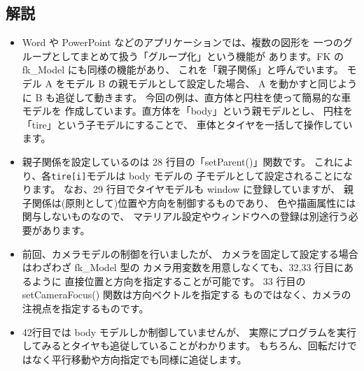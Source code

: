 \subsection*{解説}
\begin{itemize}
 \item Word や PowerPoint などのアプリケーションでは、複数の図形を
	一つのグループとしてまとめて扱う「グループ化」という機能が
	あります。FK の fk\_Model にも同様の機能があり、
	これを「親子関係」と呼んでいます。
	モデル A をモデル B の親モデルとして設定した場合、
	A を動かすと同じように B も追従して動きます。
	今回の例は、直方体と円柱を使って簡易的な車モデルを
	作成しています。直方体を「body」という親モデルとし、
	円柱を「tire」という子モデルにすることで、
	車体とタイヤを一括して操作しています。

 \item 親子関係を設定しているのは 28 行目の「setParent()」関数です。
	これにより、各\verb+tire[i]+モデルは body モデルの
	子モデルとして設定されることになります。
	なお、29 行目でタイヤモデルも window に登録していますが、
	親子関係は(原則として)位置や方向を制御するものであり、
	色や描画属性には関与しないものなので、
	マテリアル設定やウィンドウへの登録は別途行う必要があります。

 \item 前回、カメラモデルの制御を行いましたが、
	カメラを固定して設定する場合はわざわざ fk\_Model 型の
	カメラ用変数を用意しなくても、32,33 行目にあるように
	直接位置と方向を指定することが可能です。
	33 行目の setCameraFocus() 関数は方向ベクトルを指定する
	ものではなく、カメラの注視点を指定するものです。

 \item 42行目では body モデルしか制御していませんが、
	実際にプログラムを実行してみるとタイヤも追従していることがわかります。
	もちろん、回転だけではなく平行移動や方向指定でも同様に追従します。

\end{itemize}
